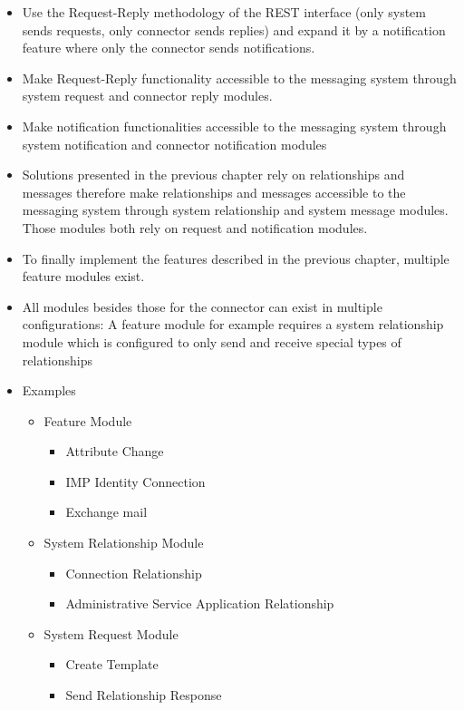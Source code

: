 \begin{itemize}
    \item Use the Request-Reply methodology of the REST interface (only system sends requests, only connector sends replies) and expand it by a notification feature where only the connector sends notifications.
    \item Make Request-Reply functionality accessible to the messaging system through system request and connector reply modules.
    \item Make notification functionalities accessible to the messaging system through system notification and connector notification modules
    \item Solutions presented in the previous chapter rely on relationships and messages therefore make relationships and messages accessible to the messaging system through system relationship and system message modules. Those modules both rely on request and notification modules.
    \item To finally implement the features described in the previous chapter, multiple feature modules exist.
    \item All modules besides those for the connector can exist in multiple configurations: A feature module for example requires a system relationship module which is configured to only send and receive special types of relationships
    \item Examples
    \begin{itemize}
        \item Feature Module
        \begin{itemize}
            \item Attribute Change
            \item IMP Identity Connection
            \item Exchange mail
        \end{itemize}
        \item System Relationship Module
        \begin{itemize}
            \item Connection Relationship
            \item Administrative Service Application Relationship
        \end{itemize}
        \item System Request Module
        \begin{itemize}
            \item Create Template
            \item Send Relationship Response

\end{itemize}
\end{itemize}
\end{itemize}

